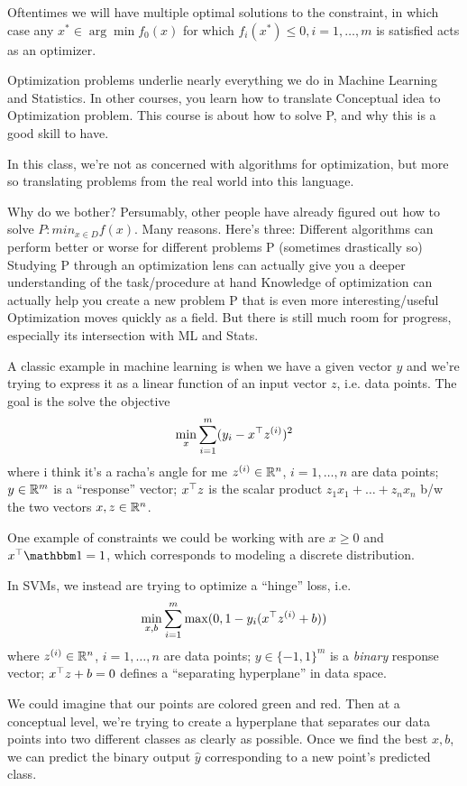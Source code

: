 \documentclass[11 pt]{scrartcl}
\begin{document}
Oftentimes we will have multiple optimal solutions to the constraint, in which case any $x^* \in \arg\min f_0(x)$ for which $f_i(x^*) \leq 0, i=1, \dots, m$ is satisfied acts as an optimizer.

Optimization problems underlie nearly everything we do in Machine Learning and Statistics. In other courses, you learn how to translate Conceptual idea to Optimization problem. This course is about how to solve P, and why this is a good skill to have.

In this class, we're not as concerned with algorithms for optimization, but more so translating problems from the real world into this language. 

Why do we bother? Persumably, other people have already figured out how to solve $P: min_{x \in D}f(x)$. Many reasons. Here's three:
\itemnum
    \ii Different algorithms can perform better or worse for different problems P (sometimes drastically so)
    \ii Studying P through an optimization lens can actually give you a deeper understanding of the task/procedure at hand
    \ii Knowledge of optimization can actually help you create a new problem P that is even more interesting/useful
\itemend
Optimization moves quickly as a field. But there is still much room for progress, especially its intersection with ML and Stats.

\begin{example}
A classic example in machine learning is when we have a given vector $y$ and we're trying to express it as a linear function of an input vector $z$, i.e. data points. 
The goal is the solve the objective 
\[ \min_x \sum_{i=1}^m (y_i - x^\top z^{(i)})^2\] 
where i think it’s a racha’s angle for me
\itemnum
    \ii $z^{(i)}\in \mathbb R^n$, $i=1, \dots, n$ are data points; 
    \ii $y\in \mathbb R^m$ is a ``response'' vector; 
    \ii $x^\top z$ is the scalar product $z_1x_1+\dots + z_nx_n$ b/w the two vectors $x,z \in \mathbb R^n$. 
\itemend

One example of constraints we could be working with are $x\geq 0$ and $x^\T \one = 1$, which corresponds to modeling a discrete distribution.

\end{example}

\begin{example}
In SVMs, we instead are trying to optimize a ``hinge'' loss, i.e. 
\[ \min_{x,b} \sum_{i=1}^m \max(0, 1-y_i(x^\top z^{(i)} + b))\] 
where 
\itemnum
    \ii $z^{(i)}\in \mathbb R^n$, $i=1, \dots, n$ are data points; 
    \ii $y\in \{-1, 1\}^m$ is a \emph{binary} response vector; 
    \ii $x^\top z + b = 0$ defines a ``separating hyperplane'' in data space. 
\itemend

We could imagine that our points are colored green and red.
Then at a conceptual level, we're trying to create a hyperplane that separates our data points into two different classes as clearly as possible. 
Once we find the best $x,b$, we can predict the binary output $\hat{y}$ corresponding to a new point's predicted class.
\end{example}
\end{document}
